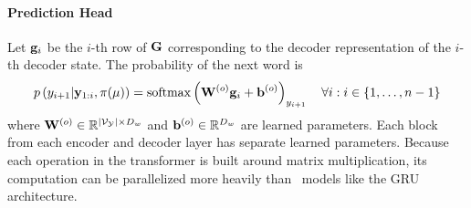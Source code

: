 \paragraph{Prediction Head}
    Let $\mathbf{g}_i$ be the $i$-th row of $\mathbf{G}$ corresponding
to the decoder representation of the $i$-th decoder state. The probability of 
  the next word is
   \[ p\left(y_{i+1}|\mathbf{y}_{1:i},\pi(\mu)\right) 
   = \operatorname*{softmax}\left( \mathbf{W}^{(o)}\mathbf{g}_i + \mathbf{b}^{(o)} \right)_{y_{i+1}} \quad \forall i : i \in \{1,\ldots, n-1\}\]
  where $\mathbf{W}^{(o)} \in \mathbb{R}^{{\left\vert \mathcal{V}_{\mathcal{Y}} \right\vert} \times D_{w}}$ 
  and $\mathbf{b}^{(o)} \in \mathbb{R}^{D_{w}}$ are learned parameters. 
Each block from each encoder and decoder layer has separate learned parameters.
Because each operation in the transformer is built around matrix 
multiplication, its computation can be parallelized more heavily than
\recurrentneuralnetwork~models like the GRU architecture.
 
  
  
%




          

%
 

